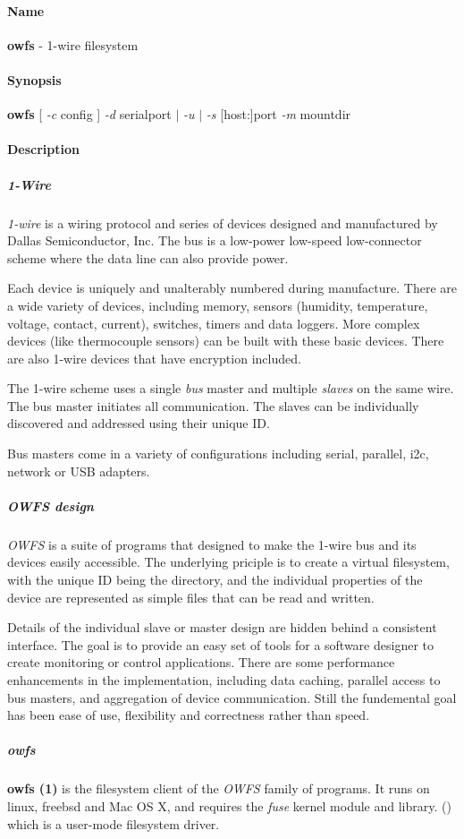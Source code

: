 \paragraph*{Name}
\textbf{owfs} - 1-wire filesystem 
\paragraph*{Synopsis}
\textbf{owfs}           [ \textit{-c} config
] \textit{-d} serialport $|$ \textit{-u} $|$ \textit{-s} [host:]port  \textit{-m} mountdir 
\paragraph*{Description}
          
\subparagraph*{1-Wire}\textit{1-wire}
 is a wiring protocol and series of devices designed and manufactured by
Dallas Semiconductor, Inc. The bus is a low-power low-speed low-connector scheme
where the data line can also provide power. 

Each device is uniquely and
unalterably numbered during manufacture. There are a wide variety of devices,
including memory, sensors (humidity, temperature, voltage, contact, current),
switches, timers and data loggers. More complex devices (like thermocouple
sensors) can be built with these basic devices. There are also 1-wire devices
that have encryption included. 

The 1-wire scheme uses a single  \textit{bus} master
and multiple \textit{slaves} on the same wire. The bus master initiates all communication.
The slaves can be  individually discovered and addressed using their unique
ID. 

Bus masters come in a variety of configurations including serial, parallel,
i2c, network or USB adapters. 
\subparagraph*{OWFS design}\textit{OWFS} is a suite of programs that
designed to make the 1-wire bus and its devices easily accessible. The underlying
priciple is to create a virtual filesystem, with the unique ID being the
directory, and the individual properties of the device are represented
as simple files that can be read and written. 

Details of the individual
slave or master design are hidden behind a consistent interface. The goal
is to  provide an easy set of tools for a software designer to create monitoring
or control applications. There  are some performance enhancements in the
implementation, including data caching, parallel access to bus  masters,
and aggregation of device communication. Still the fundemental goal has
been ease of use, flexibility  and correctness rather than speed.  
\subparagraph*{owfs}\textsf{\textbf{owfs
(1)}} is the filesystem client of the  \textit{OWFS} family of programs. It runs on
linux, freebsd and Mac OS X, and requires the  \textit{fuse} kernel module and library.
() which is a user-mode filesystem driver. 


